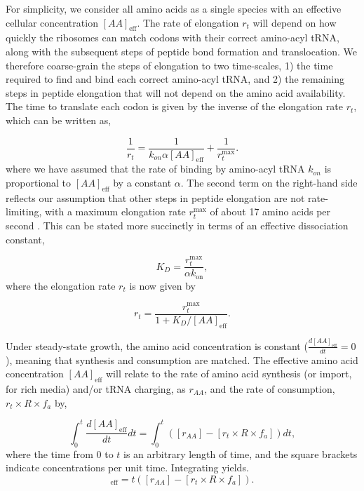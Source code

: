 For simplicity, we consider all amino acids as a single
species with an effective cellular concentration $[AA]_\text{eff}$. The
rate of elongation $r_t$ will depend on how quickly the ribosomes can match
codons with their correct amino-acyl tRNA, along with the subsequent steps of
peptide bond formation and translocation. We therefore coarse-grain the steps of
elongation to two time-scales,  1) the time required
to find and bind each correct amino-acyl tRNA, and 2) the remaining steps in
peptide elongation that will not depend on the amino acid availability. The
time to translate each codon is given by the inverse of the elongation rate
$r_t$, which can be written as,

\begin{equation}
\frac{1}{r_t} = \frac{1}{k_{on} \alpha [AA]_{\text{eff}}} + \frac{1}{r_{t}^{\text{max}}}.
\end{equation}
where we have assumed that the rate of binding by amino-acyl tRNA $k_{on}$ is
proportional to $[AA]_{\text{eff}}$ by a constant $\alpha$. The second term on the
right-hand side reflects our assumption that other steps in peptide elongation
are not rate-limiting, with a maximum elongation rate $r_{t}^{\text{max}}$ of
about 17 amino acids per second \cite{dai2016}. This can be stated more succinctly in
terms of an effective dissociation constant,

\begin{equation}
    K_D = \frac{r_{t}^{\text{max}}}{\alpha k_\text{on}},
\end{equation}
where the elongation rate $r_t$ is now given by

\begin{equation}
r_t = \frac{r_{t}^{\text{max}}}{1 + K_D/[AA]_{\text{eff}}}.
\label{eq:rt_kd_simple}
\end{equation}

Under steady-state growth, the amino acid concentration is constant
($\frac{d[AA]_\text{eff}}{dt}=0$), meaning that synthesis and consumption are matched.
The effective amino acid concentration $[AA]_{\text{eff}}$ will relate to the rate of
amino acid synthesis (or import, for rich media) and/or tRNA charging,
as $r_{AA}$,  and the rate of consumption,
$r_t\times R \times f_a$ by,

\begin{equation}
\int_{0}^{t} \frac{d[AA]_{\text{eff}}}{dt} dt =  \int_{0}^{t}([r_{AA}] - [r_t\times R \times f_a]) dt,
\label{eq:aaeff_int}
\end{equation}
where the time from 0 to $t$ is an arbitrary length of time, and the square
brackets indicate concentrations per unit time.
Integrating  yields.
\begin{equation}
[AA]_{\text{eff}} =  t([r_{AA}] - [r_t \times R \times f_a]).
\label{eq:aaeff_concs}
\end{equation}

